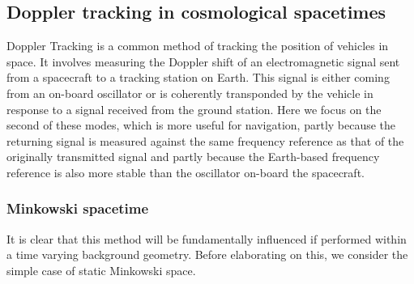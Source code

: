 \documentclass
[rmp,aps,twocolumn,showpacs,preprintnumbers,amsmath,amssymb]{revtex4}
\theoremstyle{plain}
\theoremstyle{definition}
\theoremstyle{remark}
\begin{document}
\subsection{Doppler tracking in cosmological spacetimes}
\label{sec:DopplerTracking}
%
Doppler Tracking is a common method of tracking the position of 
vehicles in space. It involves measuring the Doppler shift of 
an electromagnetic signal sent from a spacecraft to a tracking 
station on Earth.  This signal is either coming from an on-board 
oscillator or is coherently transponded by the vehicle in 
response to a signal received from the ground station. Here we 
focus on the second of these modes, which  is more useful for 
navigation, partly because the returning signal is measured 
against the same frequency reference as that of the originally 
transmitted signal and partly because the Earth-based frequency 
reference is also more stable than the oscillator on-board 
the spacecraft.


\subsubsection{Minkowski spacetime}
%
It is clear that this method will be fundamentally influenced 
if performed within a time varying background geometry. 
Before elaborating on this, we consider the simple case of 
static Minkowski space. 
\end{document}
